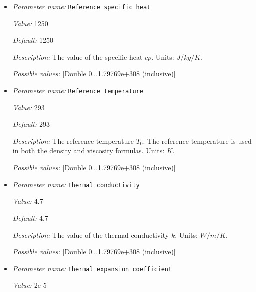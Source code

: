 \begin{itemize}
{\it Default:} 3300


{\it Description:} Reference density $\rho_0$. Units: $kg/m^3$.


{\it Possible values:} [Double 0...1.79769e+308 (inclusive)]
\item {\it Parameter name:} {\tt Reference specific heat}
\label{parameters:Material model/Simple model/Reference specific heat}


{\it Value:} 1250


{\it Default:} 1250


{\it Description:} The value of the specific heat $cp$. Units: $J/kg/K$.


{\it Possible values:} [Double 0...1.79769e+308 (inclusive)]
\item {\it Parameter name:} {\tt Reference temperature}
\label{parameters:Material model/Simple model/Reference temperature}


{\it Value:} 293


{\it Default:} 293


{\it Description:} The reference temperature $T_0$. The reference temperature is used in both the density and viscosity formulas. Units: $K$.


{\it Possible values:} [Double 0...1.79769e+308 (inclusive)]
\item {\it Parameter name:} {\tt Thermal conductivity}
\label{parameters:Material model/Simple model/Thermal conductivity}


{\it Value:} 4.7


{\it Default:} 4.7


{\it Description:} The value of the thermal conductivity $k$. Units: $W/m/K$.


{\it Possible values:} [Double 0...1.79769e+308 (inclusive)]
\item {\it Parameter name:} {\tt Thermal expansion coefficient}
\label{parameters:Material model/Simple model/Thermal expansion coefficient}


{\it Value:} 2e-5



\end{itemize}
